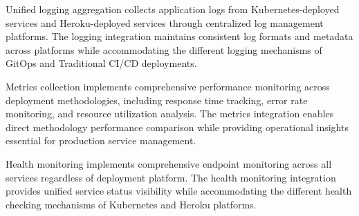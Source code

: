 Unified logging aggregation collects application logs from Kubernetes-deployed services and Heroku-deployed services through centralized log management platforms. The logging integration maintains consistent log formats and metadata across platforms while accommodating the different logging mechanisms of GitOps and Traditional CI/CD deployments.

Metrics collection implements comprehensive performance monitoring across deployment methodologies, including response time tracking, error rate monitoring, and resource utilization analysis. The metrics integration enables direct methodology performance comparison while providing operational insights essential for production service management.

Health monitoring implements comprehensive endpoint monitoring across all services regardless of deployment platform. The health monitoring integration provides unified service status visibility while accommodating the different health checking mechanisms of Kubernetes and Heroku platforms.